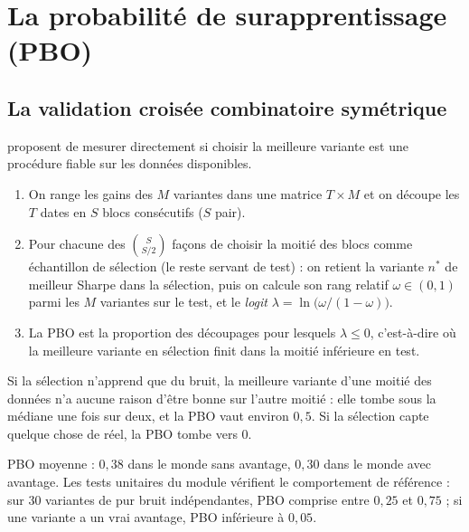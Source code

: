 \section{La probabilité de surapprentissage (PBO)}

\subsection{La validation croisée combinatoire symétrique}

\citet{bailey2017pbo} proposent de mesurer directement si \og choisir la meilleure variante\fg{} est une procédure fiable sur les données disponibles.

\begin{enumerate}
\item On range les gains des $M$ variantes dans une matrice $T\times M$ et on découpe les $T$ dates en $S$ blocs consécutifs ($S$ pair).
\item Pour chacune des $\binom{S}{S/2}$ façons de choisir la moitié des blocs comme échantillon de sélection (le reste servant de test) : on retient la variante $n^\ast$ de meilleur Sharpe dans la sélection, puis on calcule son rang relatif $\omega \in (0,1)$ parmi les $M$ variantes sur le test, et le \emph{logit} $\lambda = \ln\big(\omega/(1-\omega)\big)$.
\item La PBO est la proportion des découpages pour lesquels $\lambda \le 0$, c'est-à-dire où la meilleure variante en sélection finit dans la moitié inférieure en test.
\end{enumerate}

\begin{intuition}
Si la sélection n'apprend que du bruit, la meilleure variante d'une moitié des données n'a aucune raison d'être bonne sur l'autre moitié : elle tombe sous la médiane une fois sur deux, et la PBO vaut environ $0{,}5$. Si la sélection capte quelque chose de réel, la PBO tombe vers 0.
\end{intuition}

\begin{codebox}[ — E5, PBO des grilles de E4 ($S = 12$ blocs, 924 découpages)]
PBO moyenne : $0{,}38$ dans le monde sans avantage, $0{,}30$ dans le monde avec avantage. Les tests unitaires du module vérifient le comportement de référence : sur 30 variantes de pur bruit indépendantes, PBO comprise entre $0{,}25$ et $0{,}75$ ; si une variante a un vrai avantage, PBO inférieure à $0{,}05$.
\end{codebox}

